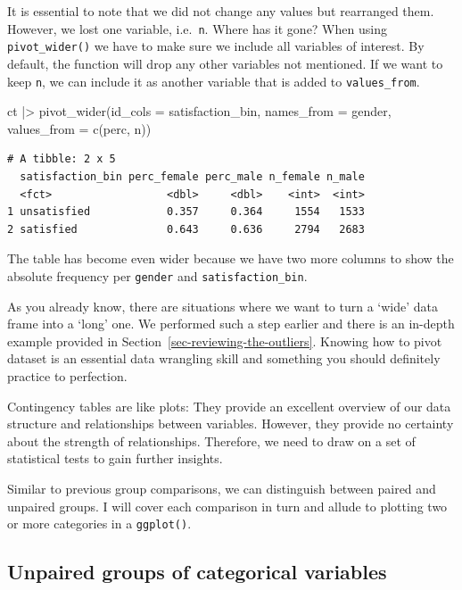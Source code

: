 \documentclass[
  letterpaper,
]{krantz}
\makeatletter
\newenvironment{Shaded}{\begin{snugshade}}{\end{snugshade}}
\newcommand{\AttributeTok}[1]{\textcolor[rgb]{0.40,0.45,0.13}{#1}}
\newcommand{\FunctionTok}[1]{\textcolor[rgb]{0.28,0.35,0.67}{#1}}
\newcommand{\NormalTok}[1]{\textcolor[rgb]{0.00,0.23,0.31}{#1}}
\newcommand{\SpecialCharTok}[1]{\textcolor[rgb]{0.37,0.37,0.37}{#1}}
\newenvironment{kframe}{%
\medskip{}
\setlength{\fboxsep}{.8em}
 \def\at@end@of@kframe{}%
 \ifinner\ifhmode%
  \def\at@end@of@kframe{\end{minipage}}%
  \begin{minipage}{\columnwidth}%
 \fi\fi%
 \def\FrameCommand##1{\hskip\@totalleftmargin \hskip-\fboxsep
 \colorbox{shadecolor}{##1}\hskip-\fboxsep
     \hskip-\linewidth \hskip-\@totalleftmargin \hskip\columnwidth}%
 \MakeFramed {\advance\hsize-\width
   \@totalleftmargin\z@ \linewidth\hsize
   \@setminipage}}%
 {\par\unskip\endMakeFramed%
 \at@end@of@kframe}
\renewenvironment{Shaded}{\begin{kframe}}{\end{kframe}}
\makeatother
\begin{document}
It is essential to note that we did not change any values but rearranged
them. However, we lost one variable, i.e.~\texttt{n}. Where has it gone?
When using \texttt{pivot\_wider()} we have to make sure we include all
variables of interest. By default, the function will drop any other
variables not mentioned. If we want to keep \texttt{n}, we can include
it as another variable that is added to \texttt{values\_from}.

\begin{Shaded}
\begin{Highlighting}[]
\NormalTok{ct }\SpecialCharTok{|\textgreater{}} \FunctionTok{pivot\_wider}\NormalTok{(}\AttributeTok{id\_cols =}\NormalTok{ satisfaction\_bin,}
                   \AttributeTok{names\_from =}\NormalTok{ gender,}
                   \AttributeTok{values\_from =} \FunctionTok{c}\NormalTok{(perc, n))}
\end{Highlighting}
\end{Shaded}

\begin{verbatim}
# A tibble: 2 x 5
  satisfaction_bin perc_female perc_male n_female n_male
  <fct>                  <dbl>     <dbl>    <int>  <int>
1 unsatisfied            0.357     0.364     1554   1533
2 satisfied              0.643     0.636     2794   2683
\end{verbatim}

The table has become even wider because we have two more columns to show
the absolute frequency per \texttt{gender} and
\texttt{satisfaction\_bin}.

As you already know, there are situations where we want to turn a `wide'
data frame into a `long' one. We performed such a step earlier and there
is an in-depth example provided in
Section~\ref{sec-reviewing-the-outliers}. Knowing how to pivot dataset
is an essential data wrangling skill and something you should definitely
practice to perfection.

Contingency tables are like plots: They provide an excellent overview of
our data structure and relationships between variables. However, they
provide no certainty about the strength of relationships. Therefore, we
need to draw on a set of statistical tests to gain further insights.

Similar to previous group comparisons, we can distinguish between paired
and unpaired groups. I will cover each comparison in turn and allude to
plotting two or more categories in a \texttt{ggplot()}.

\subsection{Unpaired groups of categorical
variables}\label{sec-unpaired-groups-categorical-variables}
\end{document}
